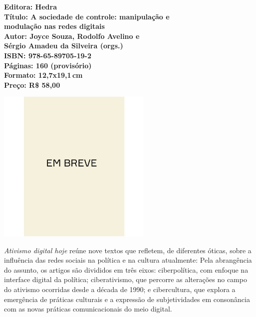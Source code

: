 \vfill
\noindent\begin{minipage}[c]{1\linewidth}
{\small\textbf{
\hspace*{-.1cm}Editora: Hedra\\
Título: A sociedade de controle: manipulação e\\modulação nas redes digitais\\
Autor: Joyce Souza, Rodolfo Avelino e\\Sérgio Amadeu da Silveira (orgs.)\\ 
ISBN: 978-65-89705-19-2\\
Páginas: 160 (provisório)\\
Formato: 12,7x19,1\,cm\\
Preço: R\$ 58,00\\
}}
\end{minipage}
\pagebreak

\begin{center}
\hspace*{.5cm}\includegraphics[width=74mm]{./CAPAS/BREVE.jpg}
\end{center}
\hspace*{-7cm}\hrulefill\hspace*{-7cm}
\medskip

\noindent{}\textit{Ativismo digital hoje} reúne nove textos que refletem, de diferentes óticas, sobre a influência das redes sociais na política e na cultura atualmente: 
Pela abrangência do assunto, os artigos são divididos em três eixos: ciberpolítica, com enfoque na interface digital da política; ciberativismo, que percorre as alterações no campo do ativismo ocorridas desde a década de 1990; e cibercultura, que explora a emergência de práticas culturais e a expressão de subjetividades em consonância com as novas práticas comunicacionais do meio digital.

